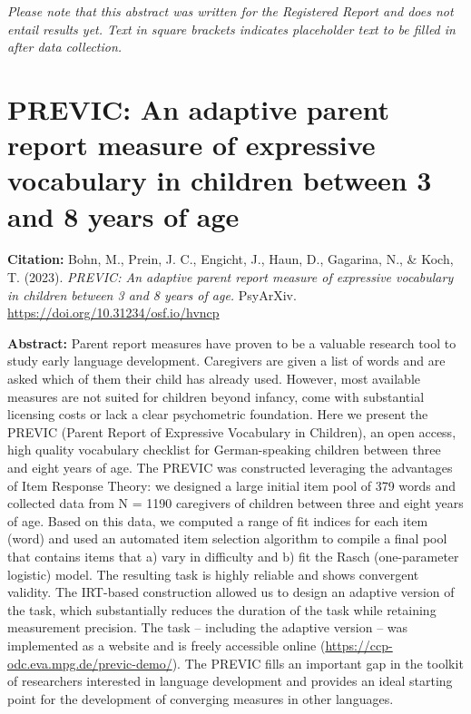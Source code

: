 \documentclass[
]{scrbook}
\begin{document}
\emph{Please note that this abstract was written for the Registered Report and does not entail results yet. Text in square brackets indicates placeholder text to be filled in after data collection.}

\newpage

\section{PREVIC: An adaptive parent report measure of expressive vocabulary in children between 3 and 8 years of age}\label{previc-an-adaptive-parent-report-measure-of-expressive-vocabulary-in-children-between-3-and-8-years-of-age}

\textbf{Citation:} Bohn, M., Prein, J. C., Engicht, J., Haun, D., Gagarina, N., \& Koch, T. (2023). \emph{PREVIC: An adaptive parent report measure of expressive vocabulary in children between 3 and 8 years of age.} PsyArXiv. \url{https://doi.org/10.31234/osf.io/hvncp}

\textbf{Abstract:} Parent report measures have proven to be a valuable research tool to study early language development. Caregivers are given a list of words and are asked which of them their child has already used. However, most available measures are not suited for children beyond infancy, come with substantial licensing costs or lack a clear psychometric foundation. Here we present the PREVIC (Parent Report of Expressive Vocabulary in Children), an open access, high quality vocabulary checklist for German-speaking children between three and eight years of age. The PREVIC was constructed leveraging the advantages of Item Response Theory: we designed a large initial item pool of 379 words and collected data from N = 1190 caregivers of children between three and eight years of age. Based on this data, we computed a range of fit indices for each item (word) and used an automated item selection algorithm to compile a final pool that contains items that a) vary in difficulty and b) fit the Rasch (one-parameter logistic) model. The resulting task is highly reliable and shows convergent validity. The IRT-based construction allowed us to design an adaptive version of the task, which substantially reduces the duration of the task while retaining measurement precision. The task -- including the adaptive version -- was implemented as a website and is freely accessible online (\url{https://ccp-odc.eva.mpg.de/previc-demo/}). The PREVIC fills an important gap in the toolkit of researchers interested in language development and provides an ideal starting point for the development of converging measures in other languages.
\end{document}
